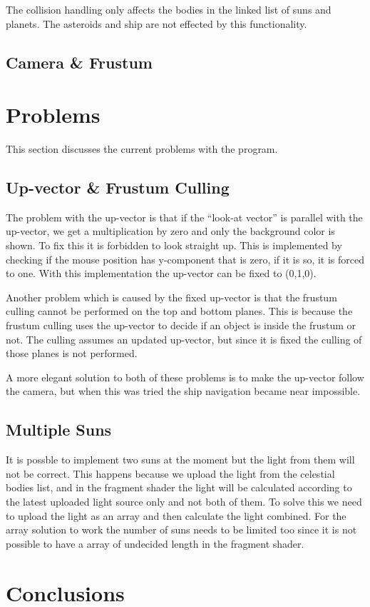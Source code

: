\documentclass[a4paper,12pt]{article} \usepackage{graphicx}
\begin{document}
The collision handling only affects the bodies in the linked list of suns and
planets. The asteroids and ship are not effected by this functionality.
\subsection{Camera \& Frustum}

\section{Problems}
This section discusses the current problems with the program.
\subsection{Up-vector \& Frustum Culling}
The problem with the up-vector is that if the ``look-at vector'' is parallel
with the up-vector, we get a multiplication by zero and  only the background
color is shown. To fix this it is forbidden to look straight up. This is
implemented by checking if the mouse position has y-component that is zero, if
it is so, it is forced to one. With this implementation the up-vector can be
fixed to (0,1,0). 


Another problem which is caused by the fixed up-vector is that the
frustum culling cannot be performed on the top and bottom planes. This is
because the frustum culling uses the up-vector to decide if an object is inside
the frustum or not. The culling assumes an updated up-vector, but since it is
fixed the culling of those planes is not performed.


A more elegant solution to both of these problems is to make the up-vector
follow the camera, but when this was tried the ship navigation became near
impossible.
\subsection{Multiple Suns}
It is possble to implement two suns at the moment but the light from them will
not be correct. This happens because we upload the light from the celestial
bodies list, and in the fragment shader the light will be calculated according
to the latest uploaded light source only and not both of them. To solve this we
need to upload the light as an array and then calculate the light combined. For
the array solution to work the number of suns needs to be limited too since it
is not possible to have a array of undecided length in the fragment shader.
\section{Conclusions}
\end{document}
